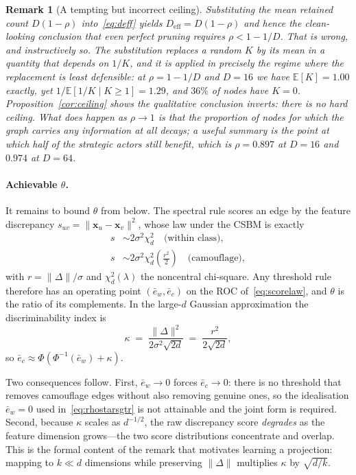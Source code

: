 \documentclass[onecolumn,pdflatex,sn-basic,Numbered]{sn-jnl}
\theoremstyle{thmstyleone}
\theoremstyle{thmstylethree}
\newtheorem{remark}[theorem]{Remark}
\begin{document}
\begin{remark}[A tempting but incorrect ceiling]
\label{rem:no-ceiling}
Substituting the \emph{mean} retained count $D(1-\rho)$
into~\eqref{eq:deff} yields $D_{\mathrm{eff}} = D(1-\rho)$ and hence the clean-looking
conclusion that even perfect pruning requires $\rho < 1-1/D$. That is wrong, and
instructively so. The substitution replaces a random $K$ by its mean in a quantity
that depends on $1/K$, and it is applied in precisely the regime where the
replacement is least defensible: at $\rho = 1-1/D$ and $D=16$ we have
$\mathbb{E}[K] = 1.00$ exactly, yet $1/\mathbb{E}[1/K \mid K\geq1] = 1.29$, and $36\%$ of
nodes have $K=0$. Proposition~\ref{cor:ceiling} shows the qualitative conclusion
inverts: there is no hard ceiling. What does happen as $\rho \to 1$ is that the
\emph{proportion} of nodes for which the graph carries any information at all decays;
a useful summary is the point at which half of the strategic actors still benefit,
which is $\rho = 0.897$ at $D=16$ and $0.974$ at $D=64$.
\end{remark}

\paragraph{Achievable $\theta$.}
It remains to bound $\theta$ from below. The spectral rule scores an edge by the feature
discrepancy $s_{uv} = \|\mathbf{x}_u - \mathbf{x}_v\|^2$, whose law under the CSBM
is exactly
\begin{align}
    s &\sim 2\sigma^2\chi^2_{d}
    \quad\text{(within class)}, \nonumber\\
    s &\sim 2\sigma^2\chi^2_{d}\!\left(\tfrac{r^2}{2}\right)
    \quad\text{(camouflage)},
    \label{eq:scorelaw}
\end{align}
with $r = \|\Delta\|/\sigma$ and $\chi^2_d(\lambda)$ the noncentral chi-square. Any
threshold rule therefore has an operating point $(\bar e_w, \bar e_c)$ on the ROC
of~\eqref{eq:scorelaw}, and $\theta$ is the ratio of its complements. In the
large-$d$ Gaussian approximation the discriminability index is
\begin{equation}
    \kappa \;=\; \frac{\|\Delta\|^2}{2\sigma^2\sqrt{2d}}
            \;=\; \frac{r^2}{2\sqrt{2d}} ,
    \label{eq:kappa}
\end{equation}
so $\bar e_c \approx \Phi(\Phi^{-1}(\bar e_w) + \kappa)$.

Two consequences follow. First, $\bar e_w \to 0$ forces $\bar e_c \to 0$: there is no
threshold that removes camouflage edges without also removing genuine ones, so the
idealisation $\bar e_w = 0$ used in~\eqref{eq:rhostarsgtr} is not attainable and the
joint form is required. Second, because $\kappa$ scales as $d^{-1/2}$, the raw
discrepancy score \emph{degrades} as the feature dimension grows---the two score
distributions concentrate and overlap. This is the formal content of the remark that
motivates learning a projection: mapping to $k \ll d$ dimensions while preserving
$\|\Delta\|$ multiplies $\kappa$ by $\sqrt{d/k}$.
\end{document}
